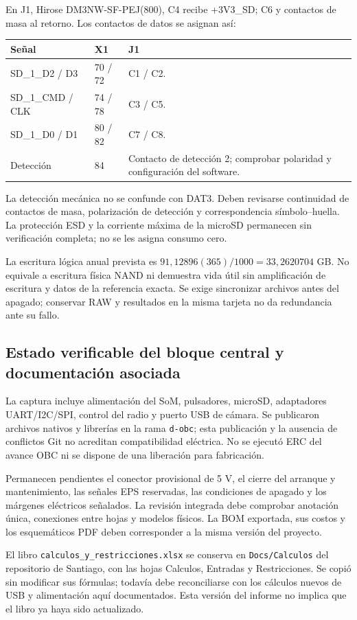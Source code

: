 \documentclass[11pt,letterpaper]{article}
\begin{document}
En J1, Hirose DM3NW-SF-PEJ(800), C4 recibe +3V3\_SD; C6 y contactos de masa al retorno. Los contactos de datos se asignan así:
\begin{tabularx}{\textwidth}{L{2.5cm}L{2cm}X}
\toprule Señal & X1 & J1 \\
\midrule
SD\_1\_D2 / D3 & 70 / 72 & C1 / C2. \\
SD\_1\_CMD / CLK & 74 / 78 & C3 / C5. \\
SD\_1\_D0 / D1 & 80 / 82 & C7 / C8. \\
Detección & 84 & Contacto de detección 2; comprobar polaridad y configuración del software. \\
\bottomrule
\end{tabularx}
La detección mecánica no se confunde con DAT3. Deben revisarse continuidad de contactos de masa, polarización de detección y correspondencia símbolo--huella. La protección ESD y la corriente máxima de la microSD permanecen sin verificación completa; no se les asigna consumo cero.

La escritura lógica anual prevista es $91,12896(365)/1000=33,2620704$ GB. No equivale a escritura física NAND ni demuestra vida útil sin amplificación de escritura y datos de la referencia exacta. Se exige sincronizar archivos antes del apagado; conservar RAW y resultados en la misma tarjeta no da redundancia ante su fallo.

\subsection{Estado verificable del bloque central y documentación asociada}
La captura incluye alimentación del SoM, pulsadores, microSD, adaptadores UART/I2C/SPI, control del radio y puerto USB de cámara. Se publicaron archivos nativos y librerías en la rama \texttt{d-obc}; esta publicación y la ausencia de conflictos Git no acreditan compatibilidad eléctrica. No se ejecutó ERC del avance OBC ni se dispone de una liberación para fabricación.

Permanecen pendientes el conector provisional de 5 V, el cierre del arranque y mantenimiento, las señales EPS reservadas, las condiciones de apagado y los márgenes eléctricos señalados. La revisión integrada debe comprobar anotación única, conexiones entre hojas y modelos físicos. La BOM exportada, sus costos y los esquemáticos PDF deben corresponder a la misma versión del proyecto.

El libro \texttt{calculos\_y\_restricciones.xlsx} se conserva en \texttt{Docs/Calculos} del repositorio de Santiago, con las hojas Calculos, Entradas y Restricciones. Se copió sin modificar sus fórmulas; todavía debe reconciliarse con los cálculos nuevos de USB y alimentación aquí documentados. Esta versión del informe no implica que el libro ya haya sido actualizado.
\end{document}
